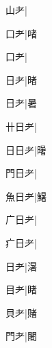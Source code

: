 \begin{multicols}{2}
{{\cjk{}{\cnsym{}　}山耂}\mktsJzrVerticalBar{}{\cjk{}{\cnsym{}　}{\cnsym{}　}{\cnsym{}　}}|{}\par
{\cjk{}{\cnsym{}　}口耂}\mktsJzrVerticalBar{}{\cjk{}{\cnsym{}　}{\cnsym{}　}{\cnsym{}　}}|{\cjk{}啫}\par
{口耂}\mktsJzrVerticalBar{}{\cjk{}{\cnsym{}　}{\cnsym{}　}{\cnsym{}　}}|{}\par
{\cjk{}{\cnsym{}　}日耂}\mktsJzrVerticalBar{}{\cjk{}{\cnsym{}　}{\cnsym{}　}{\cnsym{}　}}|{\cjk{}暏}\par
{\cjk{}{\cnsym{}　}日耂}\mktsJzrVerticalBar{}{\cjk{}{\cnsym{}　}{\cnsym{}　}{\cnsym{}　}}|{\cjk{}暑}\par
{\cjk{}卄日耂}\mktsJzrVerticalBar{}{\cjk{}{\cnsym{}　}{\cnsym{}　}{\cnsym{}　}}|{}\par
{\cjk{}日日耂}\mktsJzrVerticalBar{}{\cjk{}{\cnsym{}　}{\cnsym{}　}{\cnsym{}　}}|{\cjk{}龧}\par
{\cjk{}門日耂}\mktsJzrVerticalBar{}{\cjk{}{\cnsym{}　}{\cnsym{}　}{\cnsym{}　}}|{}\par
{\cjk{}魚日耂}\mktsJzrVerticalBar{}{\cjk{}{\cnsym{}　}{\cnsym{}　}{\cnsym{}　}}|{\cjk{}鱪}\par
{\cjk{}广日耂}\mktsJzrVerticalBar{}{\cjk{}{\cnsym{}　}{\cnsym{}　}{\cnsym{}　}}|{}\par
{\cjk{}疒日耂}\mktsJzrVerticalBar{}{\cjk{}{\cnsym{}　}{\cnsym{}　}{\cnsym{}　}}|{}\par
{日耂}\mktsJzrVerticalBar{}{\cjk{}{\cnsym{}　}{\cnsym{}　}{\cnsym{}　}}|{\cjk{}濐}\par
{\cjk{}{\cnsym{}　}目耂}\mktsJzrVerticalBar{}{\cjk{}{\cnsym{}　}{\cnsym{}　}{\cnsym{}　}}|{\cjk{}睹}\par
{\cjk{}{\cnsym{}　}貝耂}\mktsJzrVerticalBar{}{\cjk{}{\cnsym{}　}{\cnsym{}　}{\cnsym{}　}}|{\cjk{}賭}\par
{\cjk{}{\cnsym{}　}門耂}\mktsJzrVerticalBar{}{\cjk{}{\cnsym{}　}{\cnsym{}　}{\cnsym{}　}}|{\cjk{}闍}\par
}
\end{multicols}
